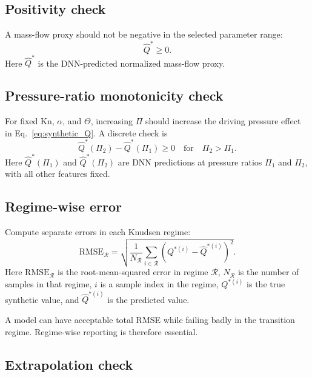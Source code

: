 \documentclass[11pt]{article}
\newcommand{\kn}{\mathrm{Kn}}
\newcommand{\rmse}{\mathrm{RMSE}}
\begin{document}
\subsection{Positivity check}

A mass-flow proxy should not be negative in the selected parameter range:
\begin{equation}
    \widehat{Q}^* \ge 0.
    \label{eq:positivity_check}
\end{equation}
Here $\widehat{Q}^*$ is the DNN-predicted normalized mass-flow proxy.

\subsection{Pressure-ratio monotonicity check}

For fixed $\kn$, $\alpha$, and $\Theta$, increasing $\Pi$ should increase the driving pressure effect in Eq.~\eqref{eq:synthetic_Q}.  A discrete check is
\begin{equation}
    \widehat{Q}^*(\Pi_2)-\widehat{Q}^*(\Pi_1) \ge 0 \quad \text{for} \quad \Pi_2>\Pi_1.
    \label{eq:monotonicity_check}
\end{equation}
Here $\widehat{Q}^*(\Pi_1)$ and $\widehat{Q}^*(\Pi_2)$ are DNN predictions at pressure ratios $\Pi_1$ and $\Pi_2$, with all other features fixed.

\subsection{Regime-wise error}

Compute separate errors in each Knudsen regime:
\begin{equation}
    \rmse_{\mathcal{R}} = \sqrt{\frac{1}{N_{\mathcal{R}}}\sum_{i\in\mathcal{R}}\left(Q^{*(i)}-\widehat{Q}^{*(i)}\right)^2}.
    \label{eq:regime_rmse}
\end{equation}
Here $\rmse_{\mathcal{R}}$ is the root-mean-squared error in regime $\mathcal{R}$, $N_{\mathcal{R}}$ is the number of samples in that regime, $i$ is a sample index in the regime, $Q^{*(i)}$ is the true synthetic value, and $\widehat{Q}^{*(i)}$ is the predicted value.

A model can have acceptable total RMSE while failing badly in the transition regime.  Regime-wise reporting is therefore essential.

\subsection{Extrapolation check}
\end{document}
